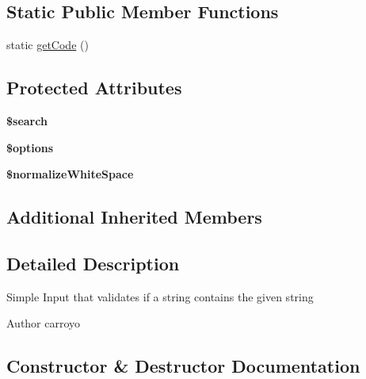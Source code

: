 \subsection*{Static Public Member Functions}
\begin{DoxyCompactItemize}
\item 
static \hyperlink{classDMA_1_1Friends_1_1Classes_1_1Notifications_1_1Inputs_1_1InputContains_a81a8b19854625a3cb7cf011149a0960a}{get\+Code} ()
\end{DoxyCompactItemize}
\subsection*{Protected Attributes}
\begin{DoxyCompactItemize}
\item 
\hypertarget{classDMA_1_1Friends_1_1Classes_1_1Notifications_1_1Inputs_1_1InputContains_abb89a8c2f31d012122a9e55921dc3c64}{}{\bfseries \$search}\label{classDMA_1_1Friends_1_1Classes_1_1Notifications_1_1Inputs_1_1InputContains_abb89a8c2f31d012122a9e55921dc3c64}

\item 
\hypertarget{classDMA_1_1Friends_1_1Classes_1_1Notifications_1_1Inputs_1_1InputContains_ac5addad5295ef180418a1b10080d5a1f}{}{\bfseries \$options}\label{classDMA_1_1Friends_1_1Classes_1_1Notifications_1_1Inputs_1_1InputContains_ac5addad5295ef180418a1b10080d5a1f}

\item 
\hypertarget{classDMA_1_1Friends_1_1Classes_1_1Notifications_1_1Inputs_1_1InputContains_a26ecdaf38bdb16787a09c4e671d63eac}{}{\bfseries \$normalize\+White\+Space}\label{classDMA_1_1Friends_1_1Classes_1_1Notifications_1_1Inputs_1_1InputContains_a26ecdaf38bdb16787a09c4e671d63eac}

\end{DoxyCompactItemize}
\subsection*{Additional Inherited Members}


\subsection{Detailed Description}
Simple Input that validates if a string contains the given string \begin{DoxyAuthor}{Author}
carroyo 
\end{DoxyAuthor}


\subsection{Constructor \& Destructor Documentation}
\hypertarget{classDMA_1_1Friends_1_1Classes_1_1Notifications_1_1Inputs_1_1InputContains_a7b2107066ad91ac5c5c671a7a5e7ff51}{}
